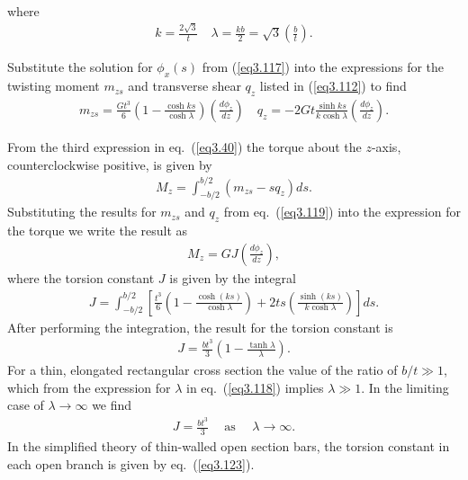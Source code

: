 \documentclass{AeroStructure-ERJohnson}
\begin{document}
\noindent wher\vspace*{-10pt}e
\begin{align}\label{eq3.118}
k=\frac{2 \sqrt{3}}{t} \quad \lambda=\frac{k b}{2}=\sqrt{3}\left(\frac{b}{t}\right).
\end{align}

\removelastskip

Substitute the solution for $\phi_{x}(s)$ from (\ref{eq3.117}) into the expressions for the twisting moment $m_{z s}$ and transverse shear $q_{z}$ listed in (\ref{eq3.112}) to\vspace*{-4pt} find
\begin{align}\label{eq3.119}
m_{z s}=\frac{G t^{3}}{6}\left(1-\frac{\cosh k s}{\cosh \lambda}\right)\left(\frac{d \phi_{z}}{d z}\right) \quad q_{z}=-2 G t \frac{\sinh k s}{k \cosh \lambda}\left(\frac{d \phi_{z}}{d z}\right).
\end{align}

\removelastskip

From the third expression in eq.~(\ref{eq3.40}) the torque about the $z$-axis, counterclockwise positive, is given\vspace*{-4pt} by
\begin{align}\label{eq3.120}
M_{z}=\int_{-b / 2}^{b / 2}\left(m_{z s}-s q_{z}\right) d s.
\end{align}
Substituting the results for $m_{z s}$ and $q_{z}$ from eq.~(\ref{eq3.119}) into the expression for the torque we write the result as
\begin{align}\label{eq3.121}
M_{z}=G J\left(\frac{d \phi_{z}}{d z}\right),
\end{align}
where the torsion constant $J$ is given by the integral
\begin{align*}
J=\int_{-b / 2}^{b / 2}\left[\frac{t^{3}}{6}\left(1-\frac{\cosh (k s)}{\cosh \lambda}\right)+2 t s\left(\frac{\sinh (k s)}{k \cosh \lambda}\right)\right] d s.
\end{align*}
After performing the integration, the result for the torsion constant is
\begin{align}\label{eq3.122}
J=\frac{b t^{3}}{3}\left(1-\frac{\tanh \lambda}{\lambda}\right).
\end{align}
For a thin, elongated rectangular cross section the value of the ratio of $b / t \gg 1$, which from the expression for $\lambda$ in eq.~(\ref{eq3.118}) implies $\lambda \gg 1$. In the limiting case of $\lambda \rightarrow \infty$ we find
\begin{align}\label{eq3.123}
J=\frac{b t^{3}}{3} \quad~\text{as } \quad \lambda \rightarrow \infty.
\end{align}
In the simplified theory of thin-walled open section bars, the torsion constant in each open branch is given by eq.~(\ref{eq3.123}).
\end{document}

